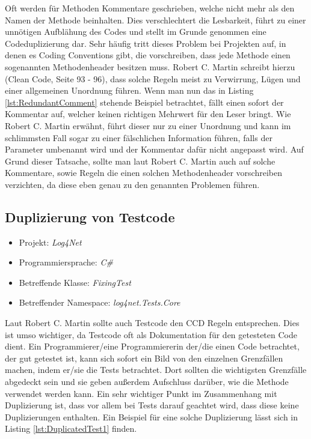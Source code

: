 \SuperPar Oft werden für Methoden Kommentare geschrieben, welche nicht mehr als den Namen der Methode beinhalten. Dies verschlechtert die Lesbarkeit, führt zu einer unnötigen Aufblähung des Codes und stellt im Grunde genommen eine Codeduplizierung dar. Sehr häufig tritt dieses Problem bei Projekten auf, in denen es Coding Conventions gibt, die vorschreiben, dass jede Methode einen sogenannten Methodenheader besitzen muss. Robert C. Martin schreibt hierzu (Clean Code, Seite 93 - 96), dass solche Regeln meist zu Verwirrung, Lügen und einer allgemeinen Unordnung führen.  Wenn man nun das in Listing \ref{lst:RedundantComment} stehende Beispiel betrachtet, fällt einen sofort der Kommentar auf, welcher keinen richtigen Mehrwert für den Leser bringt. Wie Robert C. Martin erwähnt, führt dieser nur zu einer Unordnung und kann im schlimmsten Fall sogar zu einer fälschlichen Information führen, falls der Parameter umbenannt wird und der Kommentar dafür nicht angepasst wird. Auf Grund dieser Tatsache, sollte man laut Robert C. Martin auch auf solche Kommentare, sowie Regeln die einen solchen Methodenheader vorschreiben verzichten, da diese eben genau zu den genannten Problemen führen.

\subsection{Duplizierung von Testcode}
\begin{itemize}
	\item Projekt: \textit{Log4Net}
	\item Programmiersprache: \textit{C\#}
	\item Betreffende Klasse: \textit{FixingTest}
	\item Betreffender Namespace: \textit{log4net.Tests.Core}
\end{itemize}
\SuperPar Laut Robert C. Martin sollte auch Testcode den CCD Regeln entsprechen. Dies ist umso wichtiger, da Testcode oft als Dokumentation für den getesteten Code dient. Ein Programmierer/eine Programmiererin der/die einen Code betrachtet, der gut getestet ist, kann sich sofort ein Bild von den einzelnen Grenzfällen machen, indem er/sie die Tests betrachtet. Dort sollten die wichtigsten Grenzfälle abgedeckt sein und sie geben außerdem Aufschluss darüber, wie die Methode verwendet werden kann. Ein sehr wichtiger Punkt im Zusammenhang mit Duplizierung ist, dass vor allem bei Tests darauf geachtet wird, dass diese keine Duplizierungen enthalten. Ein Beispiel für eine solche Duplizierung lässt sich in Listing \ref{lst:DuplicatedTest1} finden.



